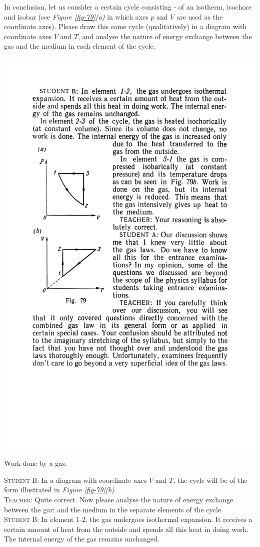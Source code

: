 \documentclass[a4paper,sfsidenotes]{tufte-book}
\begin{document}
In conclusion, let us consider a certain cycle consisting - of an isotherm, isochore and isobar (see \emph{Figure \ref{fig-79}(a)} in which axes $p$ and $V$ are used as the coordinate axes). Please draw this same cycle (qualitatively) in a diagram with coordinate axes $V$ and $T$, and analyse the nature of energy exchange between the gas and the medium in each element of the cycle.
\begin{marginfigure}%
\centering
\includegraphics[width=\linewidth]{fig-079a}
\caption{Work done by a gas.}
\label{fig-79}
\end{marginfigure}
\textsc{Student B:} In a diagram with coordinate axes $V$ and $T$, the cycle will be of the form illustrated in \emph{Figure \ref{fig-79}(b)}.
\\
\textsc{Teacher:} Quite correct. Now please analyse the nature of energy exchange between the gar; and the medium in the separate elements of the cycle.
\\
\textsc{Student B:} In element 1-2, the gas undergoes isothermal expansion. It receives a certain amount of heat from the outside and spends all this heat in doing work. The internal energy of the gas remains unchanged.
\end{document}
